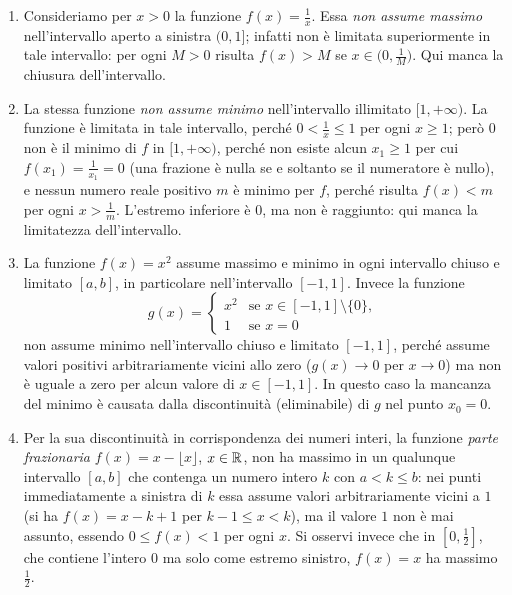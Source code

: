 \begin{enumerate}[label=\textup{(\alph*)}]
  \item Consideriamo per $x>0$ la funzione $f(x)=\frac1x$. Essa \emph{non assume
  massimo} nell'intervallo aperto a sinistra $(0,1]$; infatti non è limitata
  superiormente in tale intervallo: per ogni $M>0$ risulta $f(x)>M$ se
  $x\in\bigl(0,\frac1M\bigr)$. Qui manca la chiusura dell'intervallo.
  \item La stessa funzione \emph{non assume minimo} nell'intervallo illimitato
  $[1,+\infty)$. La funzione è limitata in tale intervallo, perché $0<\frac1x\le1$ per
  ogni $x\ge1$; però $0$ non è il minimo di $f$ in $[1,+\infty)$, perché non esiste alcun
  $x_{1}\ge1$ per cui $f(x_{1})=\frac1{x_{1}}=0$ (una frazione è nulla se e soltanto se
  il numeratore è nullo), e nessun numero reale positivo $m$ è minimo per $f$, perché
  risulta $f(x)<m$ per ogni $x>\frac1m$. L'estremo inferiore è $0$, ma non è raggiunto:
  qui manca la limitatezza dell'intervallo.
  \item La funzione $f(x)=x^{2}$ assume massimo e minimo in ogni intervallo chiuso e
  limitato $[a,b]$, in particolare nell'intervallo $[-1,1]$. Invece la funzione
  \begin{equation}\label{eq:g-senza-minimo}
    g(x)=
    \begin{cases}
      x^{2} & \text{se } x\in[-1,1]\setminus\{0\},\\
      1 & \text{se } x=0
    \end{cases}
  \end{equation}
  non assume minimo nell'intervallo chiuso e limitato $[-1,1]$, perché assume valori
  positivi arbitrariamente vicini allo zero ($g(x)\to0$ per $x\to0$) ma non è uguale a
  zero per alcun valore di $x\in[-1,1]$. In questo caso la mancanza del minimo è causata
  dalla discontinuità (eliminabile) di $g$ nel punto $x_{0}=0$.
  \item Per la sua discontinuità in corrispondenza dei numeri interi, la funzione
  \emph{parte frazionaria} $f(x)=x-\lfloor x\rfloor$, $x\in\mathbb{R}$, non ha massimo in un
  qualunque intervallo $[a,b]$ che contenga un numero intero $k$ con $a<k\le b$: nei
  punti immediatamente a sinistra di $k$ essa assume valori arbitrariamente vicini a $1$
  (si ha $f(x)=x-k+1$ per $k-1\le x<k$), ma il valore $1$ non è mai assunto, essendo
  $0\le f(x)<1$ per ogni $x$. Si osservi invece che in $[0,\frac12]$, che contiene l'intero
  $0$ ma solo come estremo sinistro, $f(x)=x$ ha massimo $\frac12$.
\end{enumerate}

